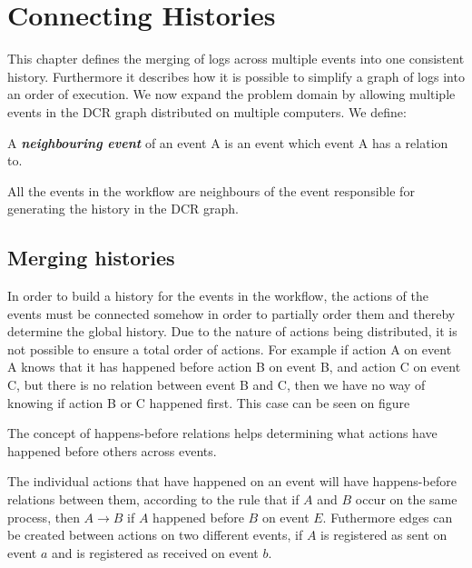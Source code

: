\chapter{Connecting Histories} %
\label{chap:connecting-histories}
	This chapter defines the merging of logs across multiple events into one consistent history. Furthermore it describes how it is possible to simplify a graph of logs into an order of execution.
	We now expand the problem domain by allowing multiple events in the DCR graph distributed on multiple computers. We define:
	\begin{definition}
		A \textit{\textbf{neighbouring event}} of an event A is an event which event A has a relation to.  
	\end{definition}
	\noindent All the events in the workflow are neighbours of the event responsible for generating the history in the DCR graph.
	
	\section{Merging histories} 
	In order to build a history for the events in the workflow, the actions of the events must be connected somehow in order to partially order them and thereby determine the global history. Due to the nature of actions being distributed, it is not possible to ensure a total order of actions. For example if action A on event A knows that it has happened before action B on event B, and action C on event C, but there is no relation between event B and C, then we have no way of knowing if action B or C happened first. This case can be seen on figure 
	
	\newpar The concept of happens-before relations helps determining what actions have happened before others across events. 
	
	The individual actions that have happened on an event will have happens-before relations between them, according to the rule that if $A$ and $B$ occur on the same process, then $A \rightarrow B$ if $A$ happened before $B$ on event $E$. 
	Futhermore edges can be created between actions on two different events, if $A$ is registered as sent on event $a$ and is registered as received on event $b$.
	
